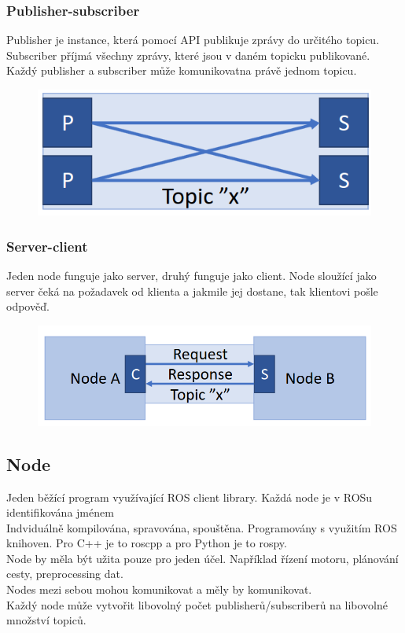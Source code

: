 \subsubsection{Publisher-subscriber}
Publisher je instance, která pomocí API publikuje zprávy do určitého topicu. \\
Subscriber příjmá všechny zprávy, které jsou v daném topicku publikované.\\
Každý publisher a subscriber může komunikovatna právě jednom topicu.\\
\begin{figure}[h!]
    \centering
    \includegraphics[scale = 0.3]{img/PubSub.png}
\end{figure}
\subsubsection{Server-client}
Jeden node funguje jako server, druhý funguje jako client. Node sloužící jako server čeká na požadavek od klienta a jakmile jej dostane, tak klientovi pošle odpověď.\\
\begin{figure}[h!]
    \centering
    \includegraphics[scale = 0.3]{img/ServClient.png}
\end{figure}
\subsection{Node}
Jeden běžící program využívající ROS client library. Každá node je v ROSu identifikována jménem\\
Indviduálně kompilována, spravována, spouštěna. Programovány s využitím ROS knihoven. Pro C++ je to roscpp a pro Python je to rospy.\\
Node by měla být užita pouze pro jeden účel. Například řízení motoru, plánování cesty, preprocessing dat.\\
Nodes mezi sebou mohou komunikovat a měly by komunikovat.\\
Každý node může vytvořit libovolný počet publisherů/subscriberů na libovolné množství topiců.\\
